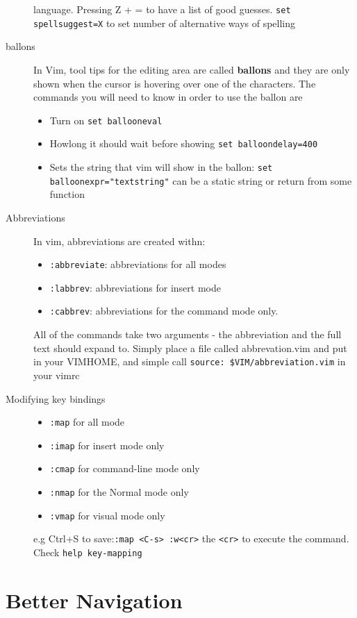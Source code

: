 \documentclass[11pt]{book}
\begin{document}
\begin{description}
language. Pressing Z + = to have a list of good guesses.
 \verb|set spellsuggest=X| to set number of alternative ways of spelling
\item[ballons] In Vim, tool tips for the editing area are called
\textbf{ballons} and they are only shown when the cursor is hovering over one of
the characters. The commands you will need to know in order to use the ballon
are
    \begin{itemize}
        \item Turn on \verb|set ballooneval|
        \item Howlong it should wait before showing \verb|set balloondelay=400|
        \item Sets the string that vim will show in the ballon:
            \verb|set balloonexpr="textstring"| can be a static string or return
            from some function
    \end{itemize}
\item[Abbreviations] In vim, abbreviations are created withn:
    \begin{itemize}
        \item \verb|:abbreviate|: abbreviations for all modes
        \item \verb|:labbrev|: abbreviations for insert mode
        \item \verb|:cabbrev|: abbreviations for the command mode only.
    \end{itemize}
    All of the commands take two arguments - the abbreviation and the full text
    should expand to.
    Simply place a file called abbrevation.vim and put in your VIMHOME, and
    simple call \verb|source: $VIM/abbreviation.vim| in your vimrc
\item[Modifying key bindings]
    \begin{itemize}
    \item \verb|:map| for all mode
    \item \verb|:imap| for insert mode only
    \item \verb|:cmap| for command-line mode only
    \item \verb|:nmap| for the Normal mode only
    \item \verb|:vmap| for visual mode only
    \end{itemize}
    e.g Ctrl+S to save:\verb|:map <C-s> :w<cr>| the \verb|<cr>| to execute the
    command. Check \verb|help key-mapping|
\end{description}
 \chapter{Better Navigation}
\end{document}
